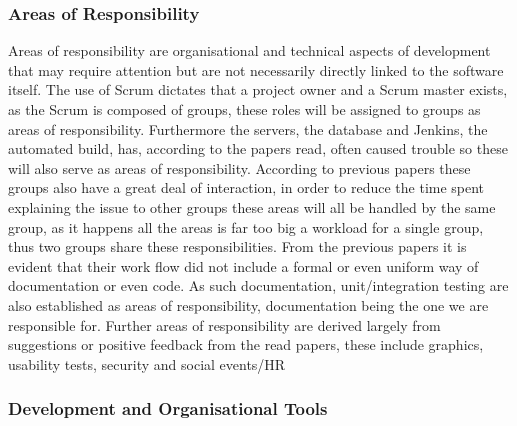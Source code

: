 \subsubsection*{Areas of Responsibility}
Areas of responsibility are organisational and technical aspects of development that may require attention but are not necessarily directly linked to the software itself.
The use of Scrum dictates that a project owner and a Scrum master exists, as the Scrum is composed of groups, these roles will be assigned to groups as areas of responsibility.
Furthermore the servers, the database and Jenkins, the automated build, has, according to the papers read, often caused trouble so these will also serve as areas of responsibility.
According to previous papers these groups also have a great deal of interaction, in order to reduce the time spent explaining the issue to other groups these areas will all be handled by the same group, as it happens all the areas is far too big a workload for a single group, thus two groups share these responsibilities.
From the previous papers it is evident that their work flow did not include a formal or even uniform way of documentation or even code.
As such documentation, unit/integration testing are also established as areas of responsibility, documentation being the one we are responsible for.
Further areas of responsibility are derived largely from suggestions or positive feedback from the read papers, these include graphics, usability tests, security and social events/HR

\subsubsection*{Development and Organisational Tools}

